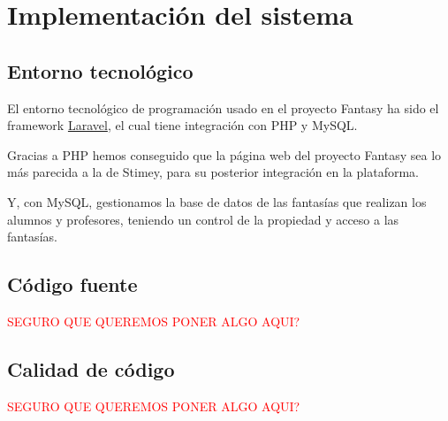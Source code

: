 \chapter{Implementación del sistema}
\section{Entorno tecnológico}
El entorno tecnológico de programación usado en el proyecto Fantasy ha sido el framework \href{https://laravel.com/}{Laravel}, el cual tiene integración con PHP y MySQL.

Gracias a PHP hemos conseguido que la página web del proyecto Fantasy sea lo más parecida a la de Stimey, para su posterior integración en la plataforma.

Y, con MySQL, gestionamos la base de datos de las fantasías que realizan los alumnos y profesores, teniendo un control de la propiedad y acceso a las fantasías.

\section{Código fuente}
\textcolor{red}{SEGURO QUE QUEREMOS PONER ALGO AQUI?}

\section{Calidad de código}
\textcolor{red}{SEGURO QUE QUEREMOS PONER ALGO AQUI?}